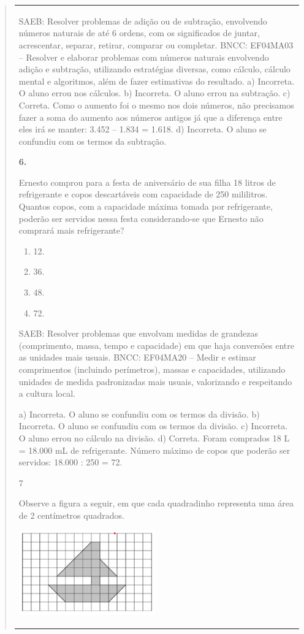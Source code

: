 \begin{mdframed}[linewidth=2pt,linecolor=salmao,roundcorner=2pt]
\begin{itemize}
{\begin{itemize}
\begin{escolha}
{\begin{quote}
{\begin{escolha}
{{{{{\begin{longtable}[]{@{}l@{}}
\begin{itemize}
{SAEB: Resolver problemas de adição ou de subtração, envolvendo números
naturais de até 6 ordens, com os significados de juntar, acrescentar,
separar, retirar, comparar ou completar.
BNCC: EF04MA03 -- Resolver e elaborar problemas com números naturais envolvendo adição e subtração,
utilizando estratégias diversas, como cálculo, cálculo mental e algoritmos, além de fazer estimativas
do resultado.
a) Incorreta. O aluno errou nos cálculos.
b) Incorreta. O aluno errou na subtração.
c) Correta. Como o aumento foi o mesmo nos dois números, não
precisamos fazer a soma do aumento aos números antigos já que a
diferença entre eles irá se manter: 3.452 -- 1.834 = 1.618.
d) Incorreta. O aluno se confundiu com os termos da subtração.

\textbf{6.}

Ernesto comprou para a festa de aniversário de sua filha 18 litros de
refrigerante e copos descartáveis com capacidade de 250 mililitros.
Quantos copos, com a capacidade máxima tomada por refrigerante, poderão
ser servidos nessa festa considerando-se que Ernesto não comprará mais
refrigerante?

\begin{enumerate}
\item
  12.
\item
  36.
\item
  48.
\item
  72.
\end{enumerate}

SAEB: Resolver problemas que envolvam medidas de grandezas
(comprimento, massa, tempo e capacidade) em que haja conversões entre as
unidades mais usuais.
BNCC: EF04MA20 -- Medir e estimar comprimentos (incluindo perímetros), massas e capacidades, utilizando
unidades de medida padronizadas mais usuais, valorizando e respeitando a cultura local.

a) Incorreta. O aluno se confundiu com os termos da divisão.
b) Incorreta. O aluno se confundiu com os termos da divisão.
c) Incorreta. O aluno errou no cálculo na divisão.
d) Correta. Foram comprados 18 L = 18.000 mL de refrigerante.
Número máximo de copos que poderão ser servidos: 18.000 : 250 = 72.

\num{7}

Observe a figura a seguir, em que cada quadradinho representa uma área de 2 centímetros quadrados.

\includegraphics[width=2.32692in,height=1.43990in]{media/image144.png}

}
\end{itemize}
\end{longtable}}}}}}
\end{escolha}}
\end{quote}}
\end{escolha}
\end{itemize}}
\end{itemize}
\end{mdframed}
